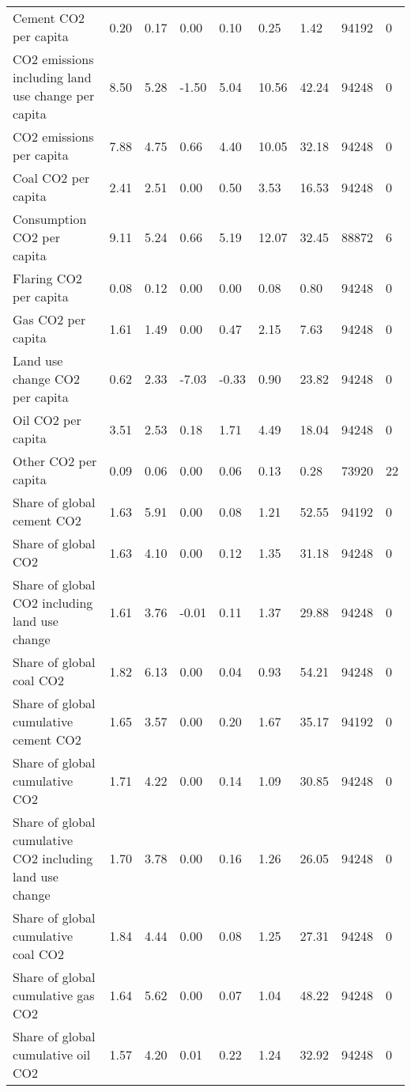 \begin{longtable}{lllllllll}
\addlinespace
Cement CO2 per capita & 0.20 & 0.17 & 0.00 & 0.10 & 0.25 & 1.42 & 94192 & 0\\
CO2 emissions including land use change per capita & 8.50 & 5.28 & -1.50 & 5.04 & 10.56 & 42.24 & 94248 & 0\\
CO2 emissions per capita & 7.88 & 4.75 & 0.66 & 4.40 & 10.05 & 32.18 & 94248 & 0\\
Coal CO2 per capita & 2.41 & 2.51 & 0.00 & 0.50 & 3.53 & 16.53 & 94248 & 0\\
Consumption CO2 per capita & 9.11 & 5.24 & 0.66 & 5.19 & 12.07 & 32.45 & 88872 & 6\\
\addlinespace
Flaring CO2 per capita & 0.08 & 0.12 & 0.00 & 0.00 & 0.08 & 0.80 & 94248 & 0\\
Gas CO2 per capita & 1.61 & 1.49 & 0.00 & 0.47 & 2.15 & 7.63 & 94248 & 0\\
Land use change CO2 per capita & 0.62 & 2.33 & -7.03 & -0.33 & 0.90 & 23.82 & 94248 & 0\\
Oil CO2 per capita & 3.51 & 2.53 & 0.18 & 1.71 & 4.49 & 18.04 & 94248 & 0\\
Other CO2 per capita & 0.09 & 0.06 & 0.00 & 0.06 & 0.13 & 0.28 & 73920 & 22\\
\addlinespace
Share of global cement CO2 & 1.63 & 5.91 & 0.00 & 0.08 & 1.21 & 52.55 & 94192 & 0\\
Share of global CO2 & 1.63 & 4.10 & 0.00 & 0.12 & 1.35 & 31.18 & 94248 & 0\\
Share of global CO2 including land use change & 1.61 & 3.76 & -0.01 & 0.11 & 1.37 & 29.88 & 94248 & 0\\
Share of global coal CO2 & 1.82 & 6.13 & 0.00 & 0.04 & 0.93 & 54.21 & 94248 & 0\\
Share of global cumulative cement CO2 & 1.65 & 3.57 & 0.00 & 0.20 & 1.67 & 35.17 & 94192 & 0\\
\addlinespace
Share of global cumulative CO2 & 1.71 & 4.22 & 0.00 & 0.14 & 1.09 & 30.85 & 94248 & 0\\
Share of global cumulative CO2 including land use change & 1.70 & 3.78 & 0.00 & 0.16 & 1.26 & 26.05 & 94248 & 0\\
Share of global cumulative coal CO2 & 1.84 & 4.44 & 0.00 & 0.08 & 1.25 & 27.31 & 94248 & 0\\
Share of global cumulative gas CO2 & 1.64 & 5.62 & 0.00 & 0.07 & 1.04 & 48.22 & 94248 & 0\\
Share of global cumulative oil CO2 & 1.57 & 4.20 & 0.01 & 0.22 & 1.24 & 32.92 & 94248 & 0\\

\end{longtable}
